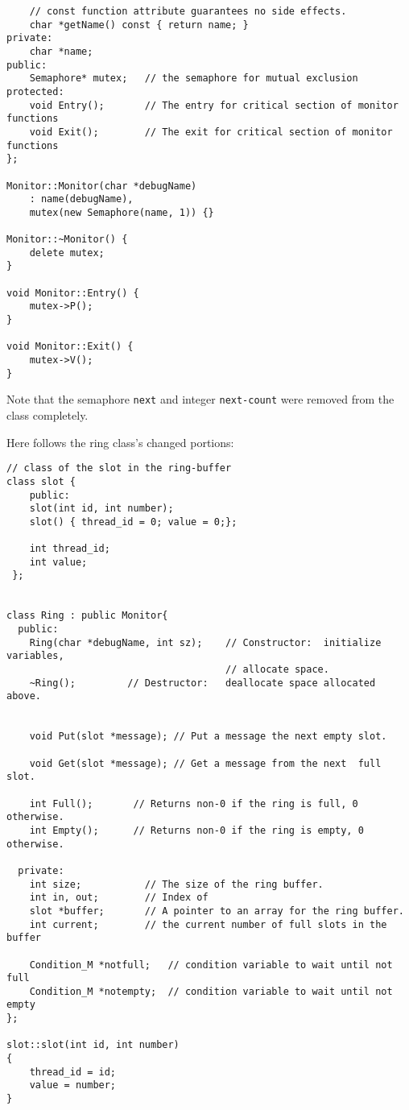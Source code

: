 \documentclass[11pt]{article}
\begin{document}
\begin{question}
\begin{verbatim}
    // const function attribute guarantees no side effects.
    char *getName() const { return name; }
private:
    char *name;
public:
    Semaphore* mutex;   // the semaphore for mutual exclusion
protected:
    void Entry();       // The entry for critical section of monitor functions
    void Exit();        // The exit for critical section of monitor functions
};

Monitor::Monitor(char *debugName)
    : name(debugName),
    mutex(new Semaphore(name, 1)) {}

Monitor::~Monitor() {
    delete mutex;
}

void Monitor::Entry() {
    mutex->P();
}

void Monitor::Exit() {
    mutex->V();
}
    \end{verbatim}

    Note that the semaphore {\tt next} and integer {\tt next-count} were removed from the class completely.

    Here follows the ring class's changed portions:

    \begin{verbatim}
// class of the slot in the ring-buffer
class slot {
    public:
    slot(int id, int number);
    slot() { thread_id = 0; value = 0;};

    int thread_id;
    int value;
 };


class Ring : public Monitor{
  public:
    Ring(char *debugName, int sz);    // Constructor:  initialize variables,
                                      // allocate space.
    ~Ring();         // Destructor:   deallocate space allocated above.


    void Put(slot *message); // Put a message the next empty slot.

    void Get(slot *message); // Get a message from the next  full slot.

    int Full();       // Returns non-0 if the ring is full, 0 otherwise.
    int Empty();      // Returns non-0 if the ring is empty, 0 otherwise.

  private:
    int size;           // The size of the ring buffer.
    int in, out;        // Index of
    slot *buffer;       // A pointer to an array for the ring buffer.
    int current;        // the current number of full slots in the buffer

    Condition_M *notfull;   // condition variable to wait until not full
    Condition_M *notempty;  // condition variable to wait until not empty
};

slot::slot(int id, int number)
{
    thread_id = id;
    value = number;
}


\end{verbatim}
\end{question}
\end{document}
